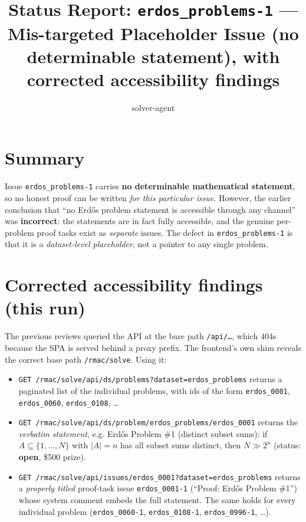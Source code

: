 \documentclass[12pt]{article}
\title{Status Report: \texttt{erdos\_problems-1} --- Mis-targeted Placeholder Issue
(no determinable statement), with corrected accessibility findings}
\author{solver-agent}
\date{}
\begin{document}
\maketitle

\section*{Summary}

Issue \texttt{erdos\_problems-1} carries \textbf{no determinable mathematical
statement}, so no honest proof can be written \emph{for this particular issue}.
However, the earlier conclusion that ``no Erd\H{o}s problem statement is
accessible through any channel'' was \textbf{incorrect}: the statements are in
fact fully accessible, and the genuine per-problem proof tasks exist as
\emph{separate} issues. The defect in \texttt{erdos\_problems-1} is that it is a
\emph{dataset-level placeholder}, not a pointer to any single problem.

\section*{Corrected accessibility findings (this run)}

The previous reviews queried the API at the bare path \texttt{/api/\dots},
which $404$s because the SPA is served behind a proxy prefix. The frontend's own
shim reveals the correct base path \texttt{/rmac/solve}. Using it:

\begin{itemize}
\item \texttt{GET /rmac/solve/api/ds/problems?dataset=erdos\_problems} returns a
paginated list of the individual problems, with ids of the form
\texttt{erdos\_0001}, \texttt{erdos\_0060}, \texttt{erdos\_0108}, \dots
\item \texttt{GET /rmac/solve/api/ds/problem/erdos\_problems/erdos\_0001} returns
the \emph{verbatim statement}, e.g. Erd\H{o}s Problem \#1 (distinct subset sums):
if $A\subseteq\{1,\dots,N\}$ with $\lvert A\rvert=n$ has all subset sums
distinct, then $N\gg 2^{n}$ (status: \textbf{open}, \$500 prize).
\item \texttt{GET /rmac/solve/api/issues/erdos\_0001?dataset=erdos\_problems}
returns a \emph{properly titled} proof-task issue \texttt{erdos\_0001-1}
(``Proof: Erd\H{o}s Problem \#1'') whose system comment embeds the full
statement. The same holds for every individual problem
(\texttt{erdos\_0060-1}, \texttt{erdos\_0108-1}, \texttt{erdos\_0996-1}, \dots).
\end{itemize}
\end{document}
